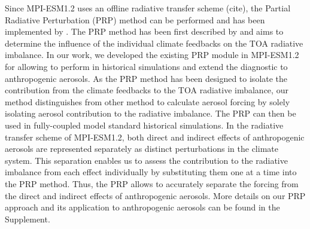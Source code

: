 \documentclass[draft]{agujournal2019}
\begin{document}
      Since MPI-ESM1.2 uses an offline radiative transfer scheme (cite), the Partial Radiative Perturbation (PRP) method can be performed and has been implemented by . The PRP method has been first described by  and aims to determine the influence of the individual climate feedbacks on the TOA radiative imbalance. In our work, we developed the existing PRP module in MPI-ESM1.2 for allowing to perform in historical simulations and extend the diagnostic to anthropogenic aerosols.
      As the PRP method has been designed to isolate the contribution from the climate feedbacks to the TOA radiative imbalance, our method distinguishes from other method to calculate aerosol forcing by solely isolating aerosol contribution to the radiative imbalance. The PRP can then be used in fully-coupled model standard historical simulations. In the radiative transfer scheme of MPI-ESM1.2, both direct and indirect effects of anthropogenic aerosols are represented separately as distinct perturbations in the climate system. This separation enables us to assess the contribution to the radiative imbalance from each effect individually by substituting them one at a time into the PRP method. Thus, the PRP allows to accurately separate the forcing from the direct and indirect effects of anthropogenic aerosols. More details on our PRP approach and its application to anthropogenic aerosols can be found in the Supplement.
      
\end{document}
